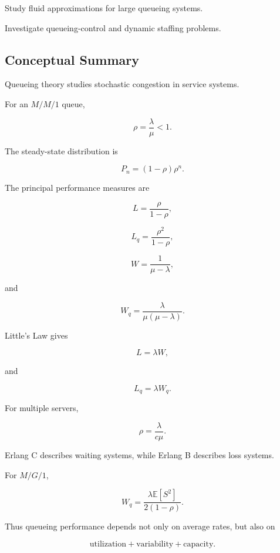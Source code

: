 \begin{exercise}[4]
Study fluid approximations for large queueing systems.
\end{exercise}

\begin{exercise}[4]
Investigate queueing-control and dynamic staffing problems.
\end{exercise}

\subsection{Conceptual Summary}
\label{subsec:queueing-summary}

Queueing theory studies stochastic congestion in service systems.

For an \(M/M/1\) queue,

\[
\boxed{
\rho
=
\frac{\lambda}{\mu}
<
1.
}
\]

The steady-state distribution is

\[
\boxed{
P_n
=
(1-\rho)\rho^n.
}
\]

The principal performance measures are

\[
\boxed{
L
=
\frac{\rho}{1-\rho},
}
\]

\[
\boxed{
L_q
=
\frac{\rho^2}{1-\rho},
}
\]

\[
\boxed{
W
=
\frac1{\mu-\lambda},
}
\]

and

\[
\boxed{
W_q
=
\frac{\lambda}{
\mu(\mu-\lambda)
}.
}
\]

Little's Law gives

\[
\boxed{
L=\lambda W,
}
\]

and

\[
\boxed{
L_q=\lambda W_q.
}
\]

For multiple servers,

\[
\boxed{
\rho
=
\frac{\lambda}{c\mu}.
}
\]

Erlang C describes waiting systems, while Erlang B describes loss systems.

For \(M/G/1\),

\[
\boxed{
W_q
=
\frac{
\lambda\mathbb{E}[S^2]
}{
2(1-\rho)
}.
}
\]

Thus queueing performance depends not only on average rates, but also on

\[
\boxed{
\text{utilization}
+
\text{variability}
+
\text{capacity}.
}
\]

